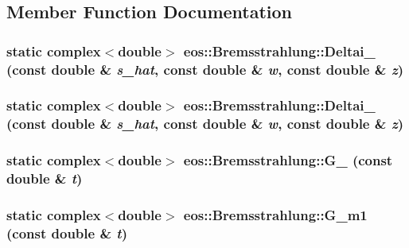 \subsection{Member Function Documentation}
\hypertarget{structeos_1_1Bremsstrahlung_a321b14e0b15b3792e25febebf9265c78}{
\subsubsection[{Deltai\_\-23}]{\setlength{\rightskip}{0pt plus 5cm}static complex$<$double$>$ eos::Bremsstrahlung::Deltai\_ (const double \& {\em s\_\-hat}, \/  const double \& {\em w}, \/  const double \& {\em z})}}
\label{structeos_1_1Bremsstrahlung_a321b14e0b15b3792e25febebf9265c78}
\hypertarget{structeos_1_1Bremsstrahlung_aa39b222255a5519ba2488e4e21562008}{
\subsubsection[{Deltai\_\-27}]{\setlength{\rightskip}{0pt plus 5cm}static complex$<$double$>$ eos::Bremsstrahlung::Deltai\_ (const double \& {\em s\_\-hat}, \/  const double \& {\em w}, \/  const double \& {\em z})}}
\label{structeos_1_1Bremsstrahlung_aa39b222255a5519ba2488e4e21562008}
\hypertarget{structeos_1_1Bremsstrahlung_a6a5cd1999022a000279e9f7f49d094ea}{
\subsubsection[{G\_\-0}]{\setlength{\rightskip}{0pt plus 5cm}static complex$<$double$>$ eos::Bremsstrahlung::G\_ (const double \& {\em t})}}
\label{structeos_1_1Bremsstrahlung_a6a5cd1999022a000279e9f7f49d094ea}
\hypertarget{structeos_1_1Bremsstrahlung_af39debb09760b0c3b6983ac6d7e28d05}{
\subsubsection[{G\_\-m1}]{\setlength{\rightskip}{0pt plus 5cm}static complex$<$double$>$ eos::Bremsstrahlung::G\_\-m1 (const double \& {\em t})}}
